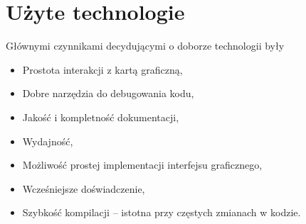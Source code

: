 \chapter*{Użyte technologie}
Głównymi czynnikami decydującymi o doborze technologii były
\begin{itemize}
	\item Prostota interakcji z kartą graficzną,
	\item Dobre narzędzia do debugowania kodu,
	\item Jakość i kompletność dokumentacji,
	\item Wydajność,
	\item Możliwość prostej implementacji interfejsu graficznego,
	\item Wcześniejsze doświadczenie,
	\item Szybkość kompilacji -- istotna przy częstych zmianach w kodzie.
\end{itemize}
